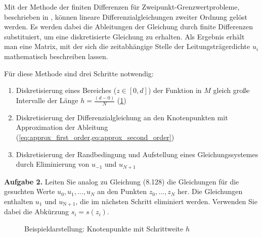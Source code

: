 Mit der Methode der finiten Differenzen für
Zweipunkt-Grenzwertprobleme, beschrieben in \cite[p. 442]{Atkinson.2004},
können lineare Differenzialgleichungen zweiter Ordnung gelöst werden. Es werden
dabei die Ableitungen der Gleichung durch finite Differenzen substituiert, um
eine diskretisierte Gleichung zu erhalten.
Als Ergebnis erhält man eine Matrix, mit der sich die zeitabhängige
Stelle der Leitungsträgerdichte $u_i$ mathematisch beschreiben lassen.

Für diese Methode sind drei Schritte notwendig:
\begin{enumerate}
	\item Diskretisierung eines Bereiches ($z\in [0,d]$) der
	      Funktion in $M$ gleich große Intervalle der Länge $h=\frac{(d-0)}{N}$
	      (\cref{fig:bsp_knotenpunkte})
	\item Diskretisierung der Differenzialgleichung an den
	      Knotenpunkten mit Approximation der Ableitung
	      (\cref{eq:approx_first_order,eq:approx_second_order})
	\item Diskretisierung der Randbedingung und Aufstellung eines
	      Gleichungssystemes durch Eliminierung von $u_{-1}$ und $u_{N+1}$
\end{enumerate}

\begin{mybox}
	\textbf{Aufgabe 2.} Leiten Sie analog zu Gleichung (8.128) die
	Gleichungen für die gesuchten Werte  $u_0, u_1, \dots , u_N$ an den Punkten
	$z_0,\dots, z_N$ her. Die Gleichungen enthalten $u_1$ und $u_\mathrm{N+1}$, die
	im nächsten Schritt eliminiert werden. Verwenden Sie dabei die Abkürzung $ s_i
		= s(z_i)$.\cite{Prof.Dr.AndreasZeiser.April2021}
\end{mybox}

\begin{figure}[htb]
	\centering
	\caption{Beispieldarstellung: Knotenpunkte mit Schrittweite $h$}
	\label{fig:bsp_knotenpunkte}
\end{figure}

